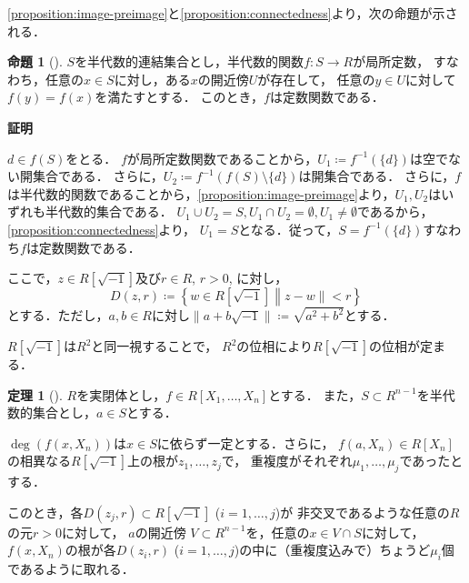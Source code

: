 \documentclass[uplatex, dvipdfmx]{jsarticle}
\makeatletter
\numberwithin{equation}{section}
\renewenvironment{proof}[1][\proofname]{\par
  \pushQED{\qed}%
  \normalfont \topsep6\p@\@plus6\p@\relax
  \trivlist
  \item\relax
  {\bfseries
  #1\@addpunct{.}}\hspace\labelsep\ignorespaces
}{
  \popQED\endtrivlist\@endpefalse
}
\newcommand{\map}[3]{{#1}\colon{#2}\rightarrow{#3}}
\newcommand{\norm}[1]{\| {#1} \|}
\theoremstyle{definition}
\newtheorem{proposition}[definition]{命題}
\newtheorem{theorem}[definition]{定理}
\renewcommand{\proofname}{\textbf{証明}}
\makeatother
\begin{document}
\cref{proposition:image-preimage}と\cref{proposition:connectedness}より，次の命題が示される．

\begin{proposition}[{\cite[Proposition 3.9]{MR2248869}}]\label{proposition:locally-constant}
     $S$を半代数的連結集合とし，半代数的関数$\map{f}{S}{R}$が局所定数，
     すなわち，任意の$x \in S$に対し，ある$x$の開近傍$U$が存在して，
     任意の$y \in U$に対して$f(y)=f(x)$を満たすとする．
     このとき，$f$は定数関数である．
\end{proposition}
\begin{proof}
     $d \in f(S)$をとる．
     $f$が局所定数関数であることから，$U_1\coloneqq f^{-1}(\{d\})$は空でない開集合である．
     さらに，$U_2\coloneqq f^{-1}(f(S) \setminus \{d\})$は開集合である．
     さらに，$f$は半代数的関数であることから，\cref{proposition:image-preimage}より，$U_1, U_2$はいずれも半代数的集合である．
     $U_1 \cup U_2 = S, U_1 \cap U_2 = \emptyset, U_1 \neq \emptyset$であるから，\cref{proposition:connectedness}より，
     $U_1 = S$となる．従って，$S = f^{-1}(\{d\})$すなわち$f$は定数関数である．
\end{proof}

ここで，$z \in R\left[ \sqrt{-1} \right]$及び$r \in R$, $r>0$, に対し，
\begin{equation}
     D(z, r)\coloneqq \left\{w \in R\left[\sqrt{-1}\right] \middle \norm{z - w} < r\right\}
\end{equation}
とする．ただし，$a,b \in R$に対し$\norm{a + b\sqrt{-1}} \coloneqq \sqrt{a^2 + b^2}$とする．

$R\left[ \sqrt{-1} \right]$は$R^2$と同一視することで，
$R^2$の位相により$R\left[ \sqrt{-1} \right]$の位相が定まる．

\begin{theorem}[{\cite[Theorem 5.12]{MR2248869}}] \label{theorem:continuity-of-roots}
     $R$を実閉体とし，$f \in R[X_1, \dots, X_n]$とする．
     また，$S \subset R^{n-1}$を半代数的集合とし，$a \in S$とする．

     $\deg (f(x,X_n))$は$x \in S$に依らず一定とする．さらに，
     $f(a,X_n) \in R[X_n]$の相異なる$R\left[\sqrt{-1} \right]$上の根が$z_1, \dots, z_j$で，
     重複度がそれぞれ$\mu_1, \dots, \mu_j$であったとする．

     このとき，各$D(z_j, r) \subset R\left[ \sqrt{-1} \right]$ ($i=1, \dots, j$)が
     非交叉であるような任意の$R$の元$r > 0$に対して，
     $a$の開近傍 $V \subset R^{n-1}$を，任意の$x \in V \cap S$に対して，
     $f(x, X_n)$の根が各$D(z_i, r)$ ($i=1, \dots, j$)の中に（重複度込みで）ちょうど$\mu_i$個であるように取れる．
\end{theorem}
\end{document}

